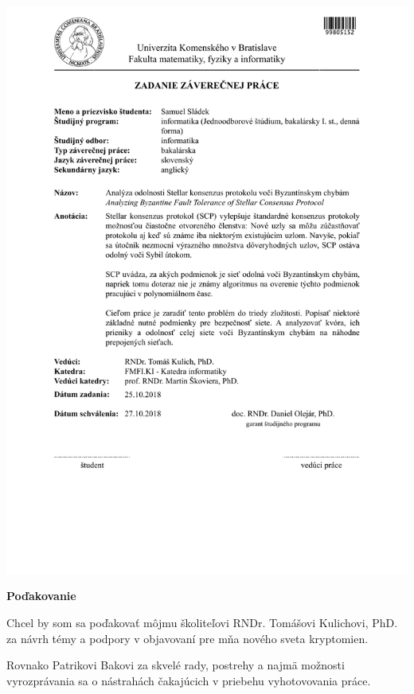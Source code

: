 \documentclass[12pt, twoside]{book}
\begin{document}
\newpage
\thispagestyle{empty}
\hspace{-2cm}\includegraphics[width=1.1\textwidth]{images/zadanie}


\frontmatter

\setcounter{page}{3}
\newpage

\begin{flushleft}\textbf{\Large Poďakovanie}\end{flushleft}
Chcel by som sa poďakovať môjmu školiteľovi RNDr. Tomášovi Kulichovi, PhD.
za návrh témy a podpory v objavovaní pre mňa nového sveta kryptomien.

Rovnako Patrikovi Bakovi za skvelé rady, postrehy a najmä možnosti
vyrozprávania sa o nástrahách čakajúcich v priebehu vyhotovovania práce.
\end{document}
